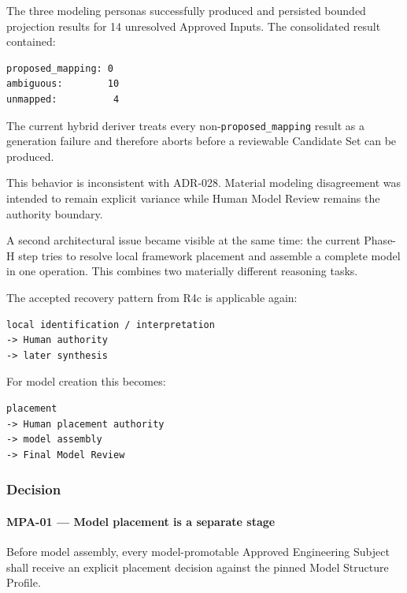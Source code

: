 The three modeling personas successfully produced and persisted bounded projection results for 14 unresolved Approved Inputs. The consolidated result contained:

\begin{verbatim}
proposed_mapping: 0
ambiguous:        10
unmapped:          4
\end{verbatim}

The current hybrid deriver treats every non-\texttt{proposed\_mapping} result as a generation failure and therefore aborts before a reviewable Candidate Set can be produced.

This behavior is inconsistent with ADR-028. Material modeling disagreement was intended to remain explicit variance while Human Model Review remains the authority boundary.

A second architectural issue became visible at the same time: the current Phase-H step tries to resolve local framework placement and assemble a complete model in one operation. This combines two materially different reasoning tasks.

The accepted recovery pattern from R4c is applicable again:

\begin{verbatim}
local identification / interpretation
-> Human authority
-> later synthesis
\end{verbatim}

For model creation this becomes:

\begin{verbatim}
placement
-> Human placement authority
-> model assembly
-> Final Model Review
\end{verbatim}

\hypertarget{decision-15}{%
\subsubsection{Decision}\label{decision-15}}

\hypertarget{mpa-01--model-placement-is-a-separate-stage}{%
\paragraph{MPA-01 --- Model placement is a separate stage}\label{mpa-01--model-placement-is-a-separate-stage}}

Before model assembly, every model-promotable Approved Engineering Subject shall receive an explicit placement decision against the pinned Model Structure Profile.

